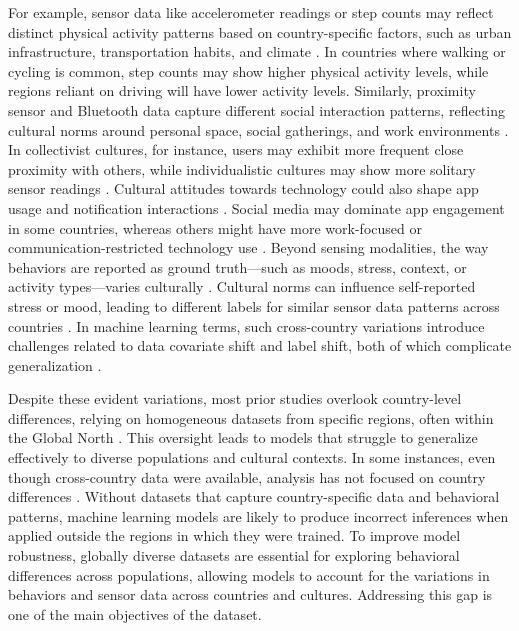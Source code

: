 For example, sensor data like accelerometer readings or step counts may reflect distinct physical activity patterns based on country-specific factors, such as urban infrastructure, transportation habits, and climate \cite{ICLEI_UrbanTransport, ZeroHourClimate_UrbanPlanning, EPA_ClimateTransportation}. In countries where walking or cycling is common, step counts may show higher physical activity levels, while regions reliant on driving will have lower activity levels. Similarly, proximity sensor and Bluetooth data capture different social interaction patterns, reflecting cultural norms around personal space, social gatherings, and work environments \cite{ozella2021using, janssen2024tracking, sekara2014strength, hernandez2024proximity}. In collectivist cultures, for instance, users may exhibit more frequent close proximity with others, while individualistic cultures may show more solitary sensor readings \cite{trumbull2001bridging, triandis2001individualism}. Cultural attitudes towards technology could also shape app usage and notification interactions \cite{bombardi2017exploring}. Social media may dominate app engagement in some countries, whereas others might have more work-focused or communication-restricted technology use \cite{poushter2018social, cheng2021prevalence}. Beyond sensing modalities, the way behaviors are reported as ground truth---such as moods, stress, context, or activity types---varies culturally \cite{mesquita1992cultural, meegahapola2023generalization, sebe2005multimodal}. Cultural norms can influence self-reported stress or mood, leading to different labels for similar sensor data patterns across countries \cite{schmidt2019wearable, mesquita1992cultural, meegahapola2024m3bat}. In machine learning terms, such cross-country variations introduce challenges related to data covariate shift and label shift, both of which complicate generalization \cite{bickel2009discriminative, koh2021wilds}.

Despite these evident variations, most prior studies overlook country-level differences, relying on homogeneous datasets from specific regions, often within the Global North \cite{meegahapola2020smartphone, phan2022mobile}. This oversight leads to models that struggle to generalize effectively to diverse populations and cultural contexts. In some instances, even though cross-country data were available, analysis has not focused on country differences \cite{servia2017mobile}. Without datasets that capture country-specific data and behavioral patterns, machine learning models are likely to produce incorrect inferences when applied outside the regions in which they were trained. To improve model robustness, globally diverse datasets are essential for exploring behavioral differences across populations, allowing models to account for the variations in behaviors and sensor data across countries and cultures. Addressing this gap is one of the main objectives of the \dataset dataset.

